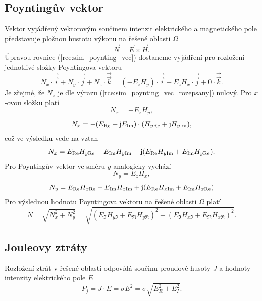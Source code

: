 \subsection*{Poyntingův vektor}
Vektor vyjádřený vektorovým součinem intenzit elektrického a magnetického pole představuje plošnou hustotu výkonu na řešené oblasti $\Omega$
\begin{equation}
	\vec N = \vec E \times\vec H.
	\label{rce:sim_poynting_vec}
\end{equation}
Úpravou rovnice (\ref{rce:sim_poynting_vec}) dostaneme vyjádření pro rozložení jednotlivé složky Poyntingova vektoru
\begin{equation}
	N_x \cdot\overrightarrow{\vec{i}} + N_y \cdot\overrightarrow{\vec{j}} + N_z \cdot\overrightarrow{\vec{k}} = (-E_z H_y) \cdot\overrightarrow{\vec{i}} + E_z H_x \cdot\overrightarrow{\vec{j}} + 0 \cdot\overrightarrow{\vec{k}}.
	\label{rce:sim_poynting_vec_rozepsany}
\end{equation}
Je zřejmé, že $N_z$ je dle výrazu (\ref{rce:sim_poynting_vec_rozepsany}) nulový. Pro $x$-ovou složku platí
\begin{displaymath}
	N_x = -E_z H_y,
\end{displaymath}
\begin{displaymath}
	N_x = -(E_{\mathrm{Re}} + \mathrm{j} E_{\mathrm{Im}})\cdot (H_{y\mathrm{Re}} + \mathrm{j} H_{y\mathrm{Im}}),
\end{displaymath}
což ve výsledku vede na vztah
\begin{displaymath}
	N_x = E_{\mathrm{Re}} H_{y\mathrm{Re}} - E_{\mathrm{Im}} H_{y\mathrm{Im}} + \mathrm{j} (E_{\mathrm{Re}} H_{y\mathrm{Im}} + E_{\mathrm{Im}} H_{y\mathrm{Re}}).
\end{displaymath}
Pro Poyntingův vektor ve směru $y$ analogicky vychází
\begin{displaymath}
	N_y = E_z H_x,
\end{displaymath}
\begin{displaymath}
	N_y = E_{\mathrm{Re}} H_{x\mathrm{Re}} - E_{\mathrm{Im}} H_{x\mathrm{Im}} + \mathrm{j} (E_{\mathrm{Re}} H_{x\mathrm{Im}} + E_{\mathrm{Im}} H_{x\mathrm{Re}})
\end{displaymath}
Pro výslednou hodnotu Poyntingova vektoru na řešené oblasti $\Omega$ platí
\begin{displaymath}
	N = \sqrt{N_{x}^{2} + N_{y}^{2}} = \sqrt{(E_\Im H_{y\Im} + E_\Re H_{y\Re})^{2} + (E_\Im H_{x\Im} + E_\Re H_{x\Re})^{2}}.
\end{displaymath}

\subsection*{Jouleovy ztráty}
Rozložení ztrát v řešené oblasti odpovídá součinu proudové husoty $J$ a hodnoty intenzity elektrického pole $E$ 
\begin{displaymath}
	P_j = J \cdot E = \sigma E^{2} = \sigma \sqrt{E_{R}^{2} + E_{I}^{2}}.
\end{displaymath}

